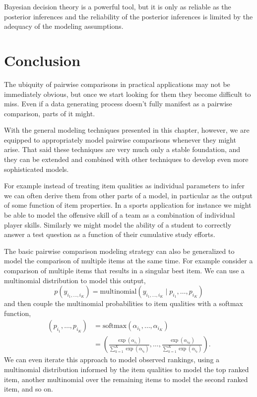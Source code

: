 \documentclass[
  letterpaper,
  DIV=11,
  numbers=noendperiod]{scrartcl}
\begin{document}
Bayesian decision theory is a powerful tool, but it is only as reliable
as the posterior inferences and the reliability of the posterior
inferences is limited by the adequacy of the modeling assumptions.

\section{Conclusion}\label{conclusion}

The ubiquity of pairwise comparisons in practical applications may not
be immediately obvious, but once we start looking for them they become
difficult to miss. Even if a data generating process doesn't fully
manifest as a pairwise comparison, parts of it might.

With the general modeling techniques presented in this chapter, however,
we are equipped to appropriately model pairwise comparisons whenever
they might arise. That said these techniques are very much only a stable
foundation, and they can be extended and combined with other techniques
to develop even more sophisticated models.

For example instead of treating item qualities as individual parameters
to infer we can often derive them from other parts of a model, in
particular as the output of some function of item properties. In a
sports application for instance we might be able to model the offensive
skill of a team as a combination of individual player skills. Similarly
we might model the ability of a student to correctly answer a test
question as a function of their cumulative study efforts.

The basic pairwise comparison modeling strategy can also be generalized
to model the comparison of multiple items at the same time. For example
consider a comparison of multiple items that results in a singular best
item. We can use a multinomial distribution to model this output, \[
p( y_{i_{1}, \ldots, i_{K} } )
=
\mathrm{multinomial} (
  y_{i_{1}, \ldots, i_{K} }  \mid
  p_{i_{1}}, \ldots, p_{i_{K}} )
\] and then couple the multinomial probabilities to item qualities with
a softmax function, \begin{align*}
( p_{i_{1}}, \ldots, p_{i_{K}} )
&=
\mathrm{softmax} ( \alpha_{i_{1}}, \ldots, \alpha_{i_{K}} )
\\
&=
\left(
\frac{ \exp( \alpha_{i_{1}} ) }
{ \sum_{k = 1}^{K} \exp( \alpha_{i_{k}} )},
\ldots,
\frac{ \exp( \alpha_{i_{K}} ) }
{ \sum_{k = 1}^{K} \exp( \alpha_{i_{k}} )}
\right).
\end{align*} We can even iterate this approach to model observed
rankings, using a multinomial distribution informed by the item
qualities to model the top ranked item, another multinomial over the
remaining items to model the second ranked item, and so on.
\end{document}
